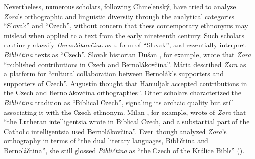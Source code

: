 
Nevertheless, numerous scholars, following Chmelenský, have tried to analyze \textit{Zora}’s orthographic and linguistic diversity through the analytical categories “Slovak” and “Czech”, without concern that these contemporary ethnonyms may mislead when applied to a text from the early nineteenth century. Such scholars routinely classify \textit{Bernolákovčina} as a form of “Slovak”, and essentially interpret \textit{Bibličtina} texts as “Czech”. Slovak historian Dušan \citet[103]{kovac_dejiny_1999}, for example, wrote that \textit{Zora} “published contributions in Czech and Bernolákovčina”. Mária \citet[53]{vyvijalova_spolok_1970} described \textit{Zora} as a platform for “cultural collaboration between Bernolák’s supporters and supporters of Czech”. Augustín \citet[18]{matovcik_vzajomna_1965} thought that Hamuljak accepted contributions in the Czech and Berno\-lákovčina orthographies”. Other scholars characterized the \textit{Bibličtina} tradition as “Biblical Czech”, signaling its archaic quality but still associating it with the Czech ethnonym. Milan \citet[124]{cechvala_michal_1970}, for example, wrote of \textit{Zora} that “the Lutheran intelligentsia wrote in Biblical Czech, and a substantial part of the Catholic intelligentsia used Bernolákovčina”. Even though \citet[224]{urhegyi_almanach_1984} analyzed \textit{Zora}’s orthography in terms of “the dual literary languages, Bibličtina and Bernoláčtina”, she still glossed \textit{Bibličtina} as “the Czech of the Králice Bible” (\citeyear[221]{urhegyi_almanach_1984}).

